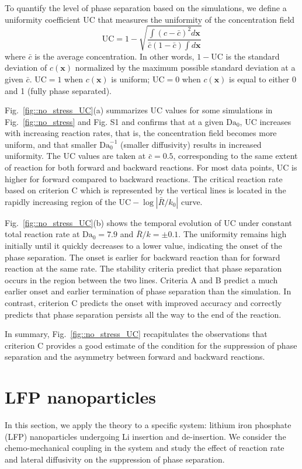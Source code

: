 \documentclass[reprint,aps,pre,superscriptaddress]{revtex4-2}
\begin{document}
To quantify the level of phase separation based on the simulations, we define a uniformity coefficient UC that measures the uniformity of the concentration field
\begin{equation}
  \text{UC} = 1 - \sqrt{\frac{\int{(c-\bar{c})^2 d\mathbf{x}}}{\bar{c}(1-\bar{c})\int{d\mathbf{x}}}}
\end{equation}
where $\bar{c}$ is the average concentration. In other words, $1-\text{UC}$ is the standard deviation of $c(\mathbf{x})$ normalized by the maximum possible standard deviation at a given $\bar{c}$. $\text{UC}=1$ when $c(\mathbf{x})$ is uniform; $\text{UC}=0$ when $c(\mathbf{x})$ is equal to either 0 and 1 (fully phase separated).

Fig.~\ref{fig::no_stress_UC}(a) summarizes UC values for some simulations in Fig.~\ref{fig::no_stress} and Fig. S1 and confirms that at a given $\text{Da}_0$, UC increases with increasing reaction rates, that is, the concentration field becomes more uniform, and that smaller $\text{Da}_0^{-1}$ (smaller diffusivity) results in increased uniformity. The UC values are taken at $\bar{c}=0.5$, corresponding to the same extent of reaction for both forward and backward reactions. For most data points, UC is higher for forward compared to backward reactions.
The critical reaction rate based on criterion C which is represented by the vertical lines is located in the rapidly increasing region of the $\text{UC}-\log{|\bar{R}/k_0|}$ curve.


Fig.~\ref{fig::no_stress_UC}(b) shows the temporal evolution of UC under constant total reaction rate at $\text{Da}_0=7.9$ and $\bar{R}/k=\pm 0.1$. The uniformity remains high initially until it quickly decreases to a lower value, indicating the onset of the phase separation. The onset is earlier for backward reaction than for forward reaction at the same rate. The stability criteria predict that phase separation occurs in the region between the two lines. Criteria A and B predict a much earlier onset and earlier termination of phase separation than the simulation. In contrast, criterion C predicts the onset with improved accuracy and correctly predicts that phase separation persists all the way to the end of the reaction.

In summary, Fig.~\ref{fig::no_stress_UC} recapitulates the observations that criterion C provides a good estimate of the condition for the suppression of phase separation and the asymmetry between forward and backward reactions.


\section{LFP nanoparticles}
\label{sec::chemomechanics}
In this section, we apply the theory to a specific system: lithium iron phosphate (LFP) nanoparticles undergoing Li insertion and de-insertion. We consider the chemo-mechanical coupling in the system and study the effect of reaction rate and lateral diffusivity on the suppression of phase separation.
\end{document}
